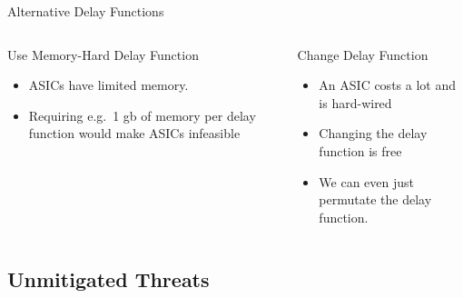 \begin{frame}{Alternative Delay Functions}
    \centering
    \begin{columns}[T, onlytextwidth]
        \begin{block}{Use Memory-Hard Delay Function}
            \begin{itemize}
                \item ASICs have limited memory.
                \item Requiring e.g.\ 1 gb of memory per delay function would make ASICs infeasible
            \end{itemize}
        \end{block}

        \begin{block}{Change Delay Function}
            \begin{itemize}
                \item An ASIC costs a lot and is hard-wired
                \item Changing the delay function is free
                \item We can even just permutate the delay function.
            \end{itemize}
        \end{block}
    \end{columns}
\end{frame}


\subsection{Unmitigated Threats}

